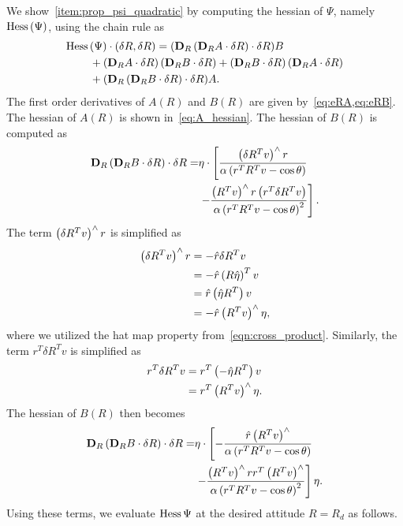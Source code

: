We show~\cref{item:prop_psi_quadratic} by computing the hessian of \( \Psi \), namely \( \mathrm{Hess} \, (\Psi) \),  using the chain rule as 
\begin{align*}
    \Hess &(\Psi)\cdot (\delta R,\delta R)= (\mathbf{D}_R\parenth{\mathbf{D}_R A \cdot \delta R}\cdot \delta R) B\\
    & + \parenth{\dirDiff{A}{R} }\parenth{\dirDiff{B}{R}} 
    + \parenth{\dirDiff{B}{R} }\parenth{\dirDiff{A}{R}}\\ &+(\mathbf{D}_R\parenth{\mathbf{D}_R B \cdot \delta R}\cdot \delta R) A.
\end{align*}
The first order derivatives of \( A(R) \) and \( B(R) \) are given by~\cref{eq:eRA,eq:eRB}. 
The hessian of \( A(R) \) is shown in~\cref{eq:A_hessian}.
The hessian of \( B(R) \) is computed as
\begin{align*}
    \mathbf{D}_{R} \left( \mathbf{D}_{R} B \cdot \delta R \right) \cdot \delta R =& \eta \cdot \left[\frac{\left( \delta R^T v \right)^\wedge r}{\alpha\left( r^T R^T v - \cos \theta \right)} \right. \\
    & \left. - \frac{\left( R^T v \right)^\wedge r \left( r^T \delta R^T v \right)}{\alpha \left( r^TR^Tv - \cos \theta \right)^2}   \right].
\end{align*}
The term \( \left( \delta R^T v \right)^\wedge r\) is simplified as
\begin{align*}
    \left( \delta R^T v \right)^\wedge r &= - \hat{r} \delta R ^T v  \\
    &= - \hat{r} \left( R \hat \eta \right)^T v  \\
    &= \hat{r} \left( \hat{\eta} R^T  \right) v  \\
    &= - \hat{r} \left( R^T v \right)^\wedge \eta ,
\end{align*}
where we utilized the hat map property from~\cref{eqn:cross_product}.
Similarly, the term \( r^T \delta R^T v \) is simplified as
\begin{align*}
    r^T \delta R^T v &= r^T \left( -\hat \eta R^T \right)v  \\
    &= r^T \left( R^T v \right)^\wedge \eta.
\end{align*}
The hessian of \( B(R) \) then becomes
\begin{align*}
    \mathbf{D}_{R} \left( \mathbf{D}_{R} B \cdot \delta R \right) \cdot \delta R =& \eta \cdot \left[ - \frac{\hat r \left( R^T v \right)^\wedge}{\alpha \left( r^T R^T v - \cos \theta \right)} \right. \\ 
    & \left. - \frac{\left( R^T v \right)^\wedge r r^T \left( R^T v \right)^\wedge }{\alpha\left( r^T R^T v - \cos \theta \right)^2}  \right] \eta.
\end{align*}
Using these terms, we evaluate \( \mathrm{Hess} \, \Psi \) at the desired attitude \( R = R_d \) as follows. 
